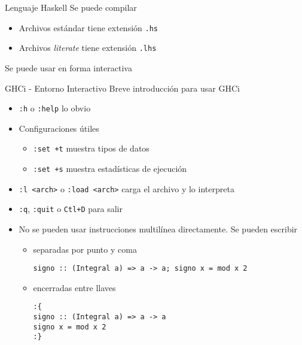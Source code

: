 \begin{frame}[fragile]{Lenguaje Haskell}
    Se puede compilar
    \begin{itemize}
        \item Archivos estándar tiene extensión \verb|.hs|
        \item Archivos \emph{literate} tiene extensión \verb|.lhs|
    \end{itemize}
    Se puede usar en forma interactiva
\end{frame}


\begin{frame}[fragile]{GHCi - Entorno Interactivo}
    Breve introducción para usar GHCi
    \begin{itemize}
        \item \verb|:h| o \verb|:help| lo obvio
        \item Configuraciones útiles
        \begin{itemize}
            \item \verb|:set +t| muestra tipos de datos
            \item \verb|:set +s| muestra estadísticas de ejecución
        \end{itemize}
        \item \verb|:l <arch>| o \verb|:load <arch>| carga el archivo y lo interpreta
        \item \verb|:q|, \verb|:quit| o \verb|Ctl+D| para salir
        \item No se pueden usar instrucciones multilínea directamente. Se pueden escribir
        \begin{itemize}
            \item separadas por punto y coma
            \begin{lstlisting}[style=consola]
signo :: (Integral a) => a -> a; signo x = mod x 2
            \end{lstlisting}
            \item encerradas entre llaves
            \begin{lstlisting}[style=consola]
:{
signo :: (Integral a) => a -> a
signo x = mod x 2
:}
            \end{lstlisting}
        \end{itemize}
    \end{itemize}
\end{frame}
